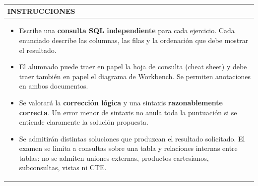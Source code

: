 \documentclass[11pt,a4paper]{article}
\begin{document}
\medskip\noindent\begin{tabularx}{\textwidth}{|X|}\hline
\cellcolor{LBgris}\color{LBcian}\bfseries INSTRUCCIONES \\ \hline
\begin{minipage}{\dimexpr\linewidth-2\tabcolsep\relax}\vspace{2mm}\small \begin{itemize}[leftmargin=4mm,nosep]\item Escribe una \textbf{consulta SQL independiente} para cada ejercicio. Cada enunciado describe las columnas, las filas y la ordenación que debe mostrar el resultado.
\item El alumnado puede traer en papel la hoja de consulta (cheat sheet) y debe traer también en papel el diagrama de \mbox{Workbench}. Se permiten anotaciones en ambos documentos.
\item Se valorará la \textbf{corrección lógica} y una sintaxis \textbf{razonablemente correcta}. Un error menor de sintaxis no anula toda la puntuación si se entiende claramente la solución propuesta.
\item Se admitirán distintas soluciones que produzcan el resultado solicitado. El examen se limita a consultas sobre una tabla y relaciones internas entre tablas: no se admiten uniones externas, productos cartesianos, subconsultas, vistas ni CTE.
\end{itemize}\vspace{2mm}\end{minipage} \\ \hline
\end{tabularx}\medskip
\end{document}
